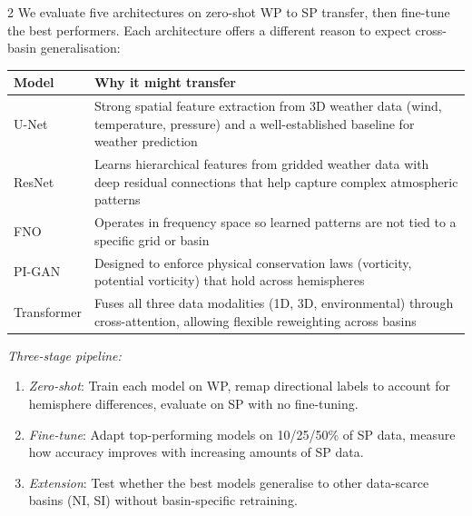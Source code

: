 \documentclass[9pt,a4paper]{article}
\begin{document}
\begin{multicols}{2}
  We evaluate five architectures on zero-shot WP to SP transfer, then fine-tune the best
  performers. Each architecture offers a different reason to expect cross-basin generalisation:
  
  \vspace{-2pt}
  {\footnotesize
    \begin{tabularx}{\linewidth}{@{}lX@{}}
      \toprule
      \textbf{Model} & \textbf{Why it might transfer}                                                                                                              \\
      \midrule
      U-Net          & Strong spatial feature extraction from 3D weather data (wind, temperature, pressure) and a well-established baseline for weather prediction \\
      ResNet         & Learns hierarchical features from gridded weather data with deep residual connections that help capture complex atmospheric patterns        \\
      FNO            & Operates in frequency space so learned patterns are not tied to a specific grid or basin                                                    \\
      PI-GAN         & Designed to enforce physical conservation laws (vorticity, potential vorticity) that hold across hemispheres                                \\
      Transformer    & Fuses all three data modalities (1D, 3D, environmental) through cross-attention, allowing flexible reweighting across basins                \\
      \bottomrule
    \end{tabularx}
  }
  \vspace{2pt}
  
  \textit{Three-stage pipeline:}
  \begin{enumerate}[nosep, leftmargin=1.2em, label=\arabic*.]
    \item \textit{Zero-shot}: Train each model on WP, remap directional labels to account for hemisphere differences, evaluate on SP with no fine-tuning.
    \item \textit{Fine-tune}: Adapt top-performing models on 10/25/50\% of SP data, measure how accuracy improves with increasing amounts of SP data.
    \item \textit{Extension}: Test whether the best models generalise to other data-scarce basins (NI, SI) without basin-specific retraining.
  \end{enumerate}
  

\end{multicols}
\end{document}
